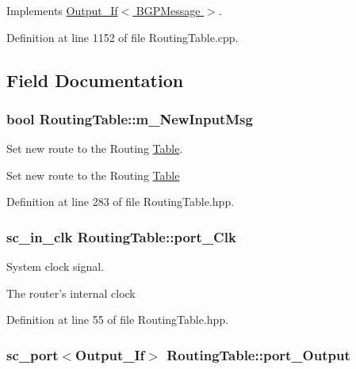 Implements \hyperlink{classOutput__If_aeef0f3dff2d02e85375e914e83140602}{Output\-\_\-\-If$<$ B\-G\-P\-Message $>$}.



Definition at line 1152 of file Routing\-Table.\-cpp.



\subsection{Field Documentation}
\hypertarget{classRoutingTable_a4a4945747e35355545c416e5965b83bc}{
\subsubsection[{m\-\_\-\-New\-Input\-Msg}]{\setlength{\rightskip}{0pt plus 5cm}bool Routing\-Table\-::m\-\_\-\-New\-Input\-Msg}}\label{classRoutingTable_a4a4945747e35355545c416e5965b83bc}


Set new route to the Routing \hyperlink{classTable}{Table}. 

Set new route to the Routing \hyperlink{classTable}{Table} 

Definition at line 283 of file Routing\-Table.\-hpp.

\hypertarget{classRoutingTable_a3f57617a0dbdfabc34534eda6731da74}{
\subsubsection[{port\-\_\-\-Clk}]{\setlength{\rightskip}{0pt plus 5cm}sc\-\_\-in\-\_\-clk Routing\-Table\-::port\-\_\-\-Clk}}\label{classRoutingTable_a3f57617a0dbdfabc34534eda6731da74}


System clock signal. 

The router's internal clock 

Definition at line 55 of file Routing\-Table.\-hpp.

\hypertarget{classRoutingTable_ac463a755c9a322a1641ae0422ee845e3}{
\subsubsection[{port\-\_\-\-Output}]{\setlength{\rightskip}{0pt plus 5cm}sc\-\_\-port$<${\bf Output\-\_\-\-If}$>$ Routing\-Table\-::port\-\_\-\-Output}}\label{classRoutingTable_ac463a755c9a322a1641ae0422ee845e3}


